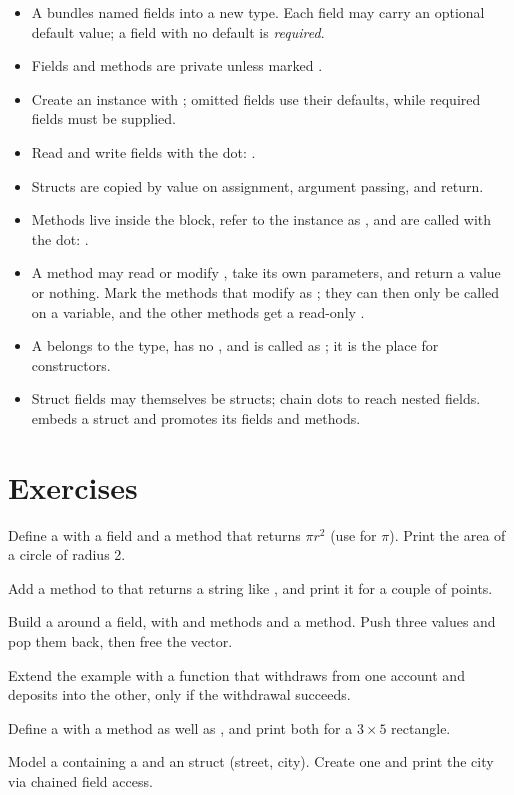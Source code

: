 \begin{itemize}[leftmargin=1.4em]
  \item A  bundles named fields into a new type. Each field may
        carry an optional default value; a field with no default is
        \emph{required}.
  \item Fields and methods are private unless marked .
  \item Create an instance with ; omitted
        fields use their defaults, while required fields must be supplied.
  \item Read and write fields with the dot: .
  \item Structs are copied by value on assignment, argument passing, and return.
  \item Methods live inside the  block, refer to the instance as
        , and are called with the dot: .
  \item A method may read or modify , take its own parameters, and
        return a value or nothing. Mark the methods that modify  as
        ; they can then only be called on a  variable,
        and the other methods get a read-only .
  \item A  belongs to the type, has no , and is
        called as ; it is the place for constructors.
  \item Struct fields may themselves be structs; chain dots to reach nested
        fields.  embeds a struct and promotes its fields and methods.
\end{itemize}

\section{Exercises}

\exercise Define a  with a  field and a
method  that returns $\pi r^2$ (use  for $\pi$).
Print the area of a circle of radius 2.

\exercise Add a  method to  that returns a string
like , and print it for a couple of points.

\exercise Build a  around a  field, with
 and  methods and a  method. Push three values
and pop them back, then free the vector.

\exercise Extend the  example with a function
 that
withdraws from one account and deposits into the other, only if the withdrawal
succeeds.

\exercise Define a  with a  method as well
as , and print both for a $3 \times 5$ rectangle.

\exercise Model a  containing a  and an
 struct (street, city). Create one and print the city via chained
field access.
